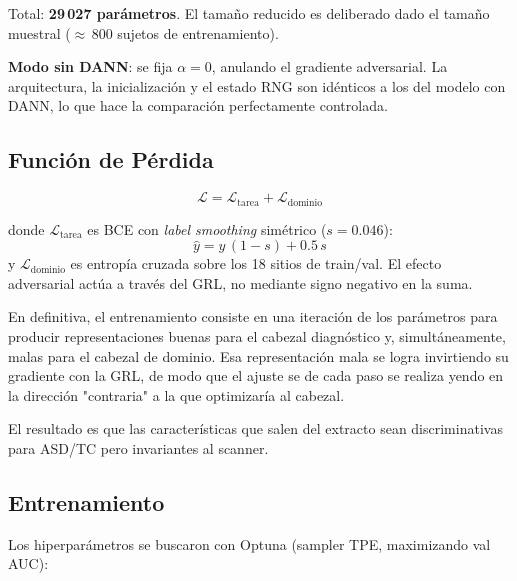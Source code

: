\documentclass[conference]{IEEEtran}
\begin{document}
Total: \textbf{29\,027 parámetros}. El tamaño reducido es deliberado
dado el tamaño muestral ($\approx$\,800 sujetos de entrenamiento).

\textbf{Modo sin DANN}: se fija $\alpha\!=\!0$, anulando el gradiente
adversarial. La arquitectura, la inicialización y el estado RNG son
idénticos a los del modelo con DANN, lo que hace la comparación
perfectamente controlada.

\subsection{Función de Pérdida}

\begin{equation}
  \mathcal{L} = \mathcal{L}_\text{tarea} + \mathcal{L}_\text{dominio}
\end{equation}

donde $\mathcal{L}_\text{tarea}$ es BCE con \emph{label smoothing}
simétrico ($s\!=\!0.046$):
\begin{equation}
  \hat{y} = y\,(1-s) + 0.5\,s
\end{equation}
y $\mathcal{L}_\text{dominio}$ es entropía cruzada sobre los 18 sitios
de train/val. El efecto adversarial actúa a través del GRL, no
mediante signo negativo en la suma.

En definitiva, el entrenamiento consiste en una iteración de los parámetros para producir representaciones buenas para el cabezal diagnóstico y, simultáneamente, malas para el cabezal de dominio. Esa representación mala se logra invirtiendo su gradiente con la GRL, de modo que el ajuste se de cada paso se realiza yendo en la dirección "contraria" a la que optimizaría al cabezal. 

El resultado es que las características que salen del extracto sean discriminativas para ASD/TC pero invariantes al scanner.

\subsection{Entrenamiento}

Los hiperparámetros se buscaron con Optuna (sampler TPE, maximizando
val\,AUC):
\end{document}

